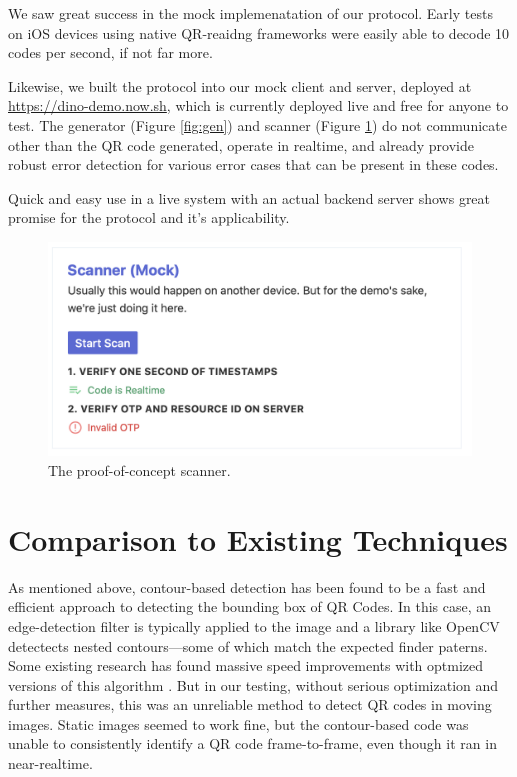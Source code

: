 \documentclass[10pt,twocolumn,letterpaper]{article}
\begin{document}
We saw great success in the mock implemenatation of our protocol. Early tests on iOS devices using native QR-reaidng frameworks were easily able to decode 10 codes per second, if not far more.

Likewise, we built the protocol into our mock client and server, deployed at \url{https://dino-demo.now.sh}, which is currently deployed live and free for anyone to test. The generator (Figure \ref{fig:gen}) and scanner (Figure \ref{fig:scan}) do not communicate other than the QR code generated, operate in realtime, and already provide robust error detection for various error cases that can be present in these codes.

Quick and easy use in a live system with an actual backend server shows great promise for the protocol and it's applicability.

\begin{figure}[t]
   \begin{center}
      \includegraphics[width=0.8\linewidth]{scan.png}
   \end{center}
      \caption{The proof-of-concept scanner.}
   \label{fig:scan}
\end{figure}

\section{Comparison to Existing Techniques}

As mentioned above, contour-based detection has been found to be a fast and efficient approach to detecting the bounding box of QR Codes. In this case, an edge-detection filter is typically applied to the image and a library like OpenCV detectects nested contours—some of which match the expected finder paterns. Some existing research has found massive speed improvements with optmized versions of this algorithm \cite{tong_qr_2014}. But in our testing, without serious optimization and further measures, this was an unreliable method to detect QR codes in moving images. Static images seemed to work fine, but the contour-based code was unable to consistently identify a QR code frame-to-frame, even though it ran in near-realtime.



{\small


}
\end{document}
